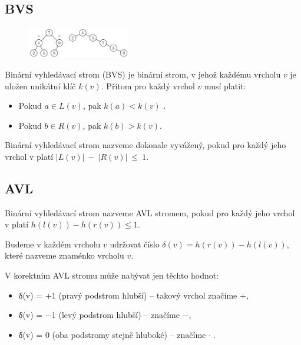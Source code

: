 \documentclass{szzclass}
\begin{document}
\subsection{BVS}

\begin{figure}[h]
\centering
\includegraphics[width=0.4\textwidth]{topics/bi-spol-5/images/bvs.png}
\end{figure}

Binární vyhledávací strom (BVS) je binární strom, v jehož
každému vrcholu $v$ je uložen unikátní klíč $k(v)$. Přitom pro každý
vrchol $v$ musí platit:
\begin{itemize}
    \item Pokud $a \in L(v)$, pak $k(a) < k(v)$ .
    \item Pokud $b \in R(v)$, pak $k(b) > k(v)$.
\end{itemize}

Binární vyhledávací strom nazveme dokonale vyvážený, pokud pro každý jeho vrchol v platí $|L(v)|~-~|R(v)|~\leq~1$.

\subsection{AVL}

Binární vyhledávací strom nazveme AVL stromem, pokud pro každý
jeho vrchol v platí $h(l(v)) − h(r(v)) \leq 1$.

Budeme v každém vrcholu $v$ udržovat číslo $δ(v) = h(r(v)) - h(l(v))$, které nazveme znaménko vrcholu $v$.

V korektním AVL stromu může nabývat jen těchto hodnot:
\begin{itemize}
    \item δ(v) = +1 (pravý podstrom hlubší) – takový vrchol značíme \textcircled{$+$},
    \item δ(v) = −1 (levý podstrom hlubší) – značíme \textcircled{$-$},
    \item δ(v) = 0 (oba podstromy stejně hluboké) – značíme \textcircled{$\cdot$}.
\end{itemize}

\end{document}
